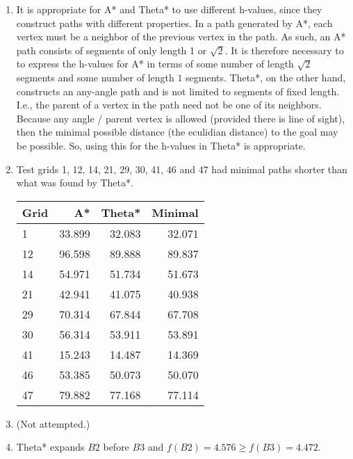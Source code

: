 \documentclass[12pt]{article}
\begin{document}
\begin{enumerate}[label={\large\textbf{\alph*)}}]
\item
It is appropriate for A* and Theta* to use different h-values,
since they construct paths with different properties.
In a path generated by A*, each vertex must be a neighbor of the previous vertex in the path.
As such, an A* path consists of segments of only length 1 or $\sqrt{2}$.
It is therefore necessary to to express the h-values for A* in terms of
some number of length $\sqrt{2}$ segments and some number of length $1$ segments.
Theta*, on the other hand, constructs an any-angle path and is not limited to segments of fixed length.
I.e., the parent of a vertex in the path need not be one of its neighbors.
Because any angle / parent vertex is allowed (provided there is line of sight),
then the minimal possible distance (the eculidian distance) to the goal may be possible.
So, using this for the h-values in Theta* is appropriate.

\item
Test grids 1, 12, 14, 21, 29, 30, 41, 46 and 47 had minimal paths shorter than what was found by Theta*.

\begin{tabular}{|l|r|r|r|}
\hline
Grid & A* & Theta* & Minimal \\
\hline
1  & 33.899 & 32.083 & 32.071 \\
12 & 96.598 & 89.888 & 89.837 \\
14 & 54.971 & 51.734 & 51.673 \\
21 & 42.941 & 41.075 & 40.938 \\
29 & 70.314 & 67.844 & 67.708 \\
30 & 56.314 & 53.911 & 53.891 \\
41 & 15.243 & 14.487 & 14.369 \\
46 & 53.385 & 50.073 & 50.070 \\
47 & 79.882 & 77.168 & 77.114 \\
\hline
\end{tabular}

\item (Not attempted.)

\item Theta* expands $B2$ before $B3$ and $f(B2) = 4.576 \ge f(B3) = 4.472$.

\end{enumerate}
\end{document}
